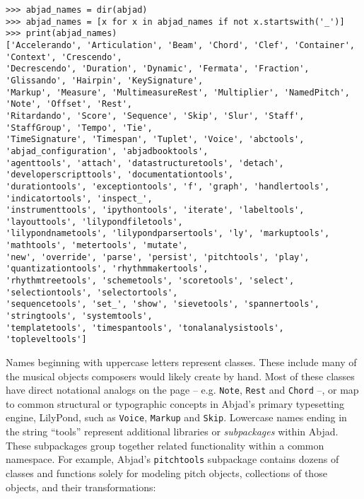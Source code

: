 \begin{abjadbookoutput}
\begin{singlespacing}
\vspace{-0.5\baselineskip}
\begin{verbatim}
>>> abjad_names = dir(abjad)
>>> abjad_names = [x for x in abjad_names if not x.startswith('_')]
>>> print(abjad_names)
['Accelerando', 'Articulation', 'Beam', 'Chord', 'Clef', 'Container', 'Context', 'Crescendo',
'Decrescendo', 'Duration', 'Dynamic', 'Fermata', 'Fraction', 'Glissando', 'Hairpin', 'KeySignature',
'Markup', 'Measure', 'MultimeasureRest', 'Multiplier', 'NamedPitch', 'Note', 'Offset', 'Rest',
'Ritardando', 'Score', 'Sequence', 'Skip', 'Slur', 'Staff', 'StaffGroup', 'Tempo', 'Tie',
'TimeSignature', 'Timespan', 'Tuplet', 'Voice', 'abctools', 'abjad_configuration', 'abjadbooktools',
'agenttools', 'attach', 'datastructuretools', 'detach', 'developerscripttools', 'documentationtools',
'durationtools', 'exceptiontools', 'f', 'graph', 'handlertools', 'indicatortools', 'inspect_',
'instrumenttools', 'ipythontools', 'iterate', 'labeltools', 'layouttools', 'lilypondfiletools',
'lilypondnametools', 'lilypondparsertools', 'ly', 'markuptools', 'mathtools', 'metertools', 'mutate',
'new', 'override', 'parse', 'persist', 'pitchtools', 'play', 'quantizationtools', 'rhythmmakertools',
'rhythmtreetools', 'schemetools', 'scoretools', 'select', 'selectiontools', 'selectortools',
'sequencetools', 'set_', 'show', 'sievetools', 'spannertools', 'stringtools', 'systemtools',
'templatetools', 'timespantools', 'tonalanalysistools', 'topleveltools']
\end{verbatim}
\end{singlespacing}
\end{abjadbookoutput}

\noindent Names beginning with uppercase letters represent classes. These
include many of the musical objects composers would likely create by hand. Most
of these classes have direct notational analogs on the page -- e.g.
\texttt{Note}, \texttt{Rest} and \texttt{Chord} --, or map to common structural
or typographic concepts in Abjad's primary typesetting engine, LilyPond, such
as \texttt{Voice}, \texttt{Markup} and \texttt{Skip}. Lowercase names ending in
the string \enquote{tools} represent additional libraries or \emph{subpackages}
within Abjad. These subpackages group together related functionality within a
common namespace. For example, Abjad's \texttt{pitchtools} subpackage contains
dozens of classes and functions solely for modeling pitch objects, collections
of those objects, and their transformations:


